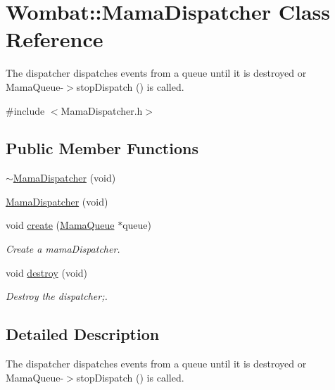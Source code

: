 \hypertarget{classWombat_1_1MamaDispatcher}{
\section{Wombat::MamaDispatcher Class Reference}
\label{classWombat_1_1MamaDispatcher}
}


The dispatcher dispatches events from a queue until it is destroyed or MamaQueue-\/$>$stopDispatch () is called.  


{\ttfamily \#include $<$MamaDispatcher.h$>$}\subsection*{Public Member Functions}
\begin{DoxyCompactItemize}
\item 
\hyperlink{classWombat_1_1MamaDispatcher_a3a997e7754864628bbd644d6536cffba}{$\sim$MamaDispatcher} (void)
\item 
\hyperlink{classWombat_1_1MamaDispatcher_a5942bec14afa1fd102d3e87fa2f04202}{MamaDispatcher} (void)
\item 
void \hyperlink{classWombat_1_1MamaDispatcher_a0e06030055142e7c6f576a560a17f3b9}{create} (\hyperlink{classWombat_1_1MamaQueue}{MamaQueue} $\ast$queue)
\begin{DoxyCompactList}\small\item\em Create a mamaDispatcher. \item\end{DoxyCompactList}\item 
void \hyperlink{classWombat_1_1MamaDispatcher_aef804bf330b0fec1594bdddf41c0d82c}{destroy} (void)
\begin{DoxyCompactList}\small\item\em Destroy the dispatcher;. \item\end{DoxyCompactList}\end{DoxyCompactItemize}


\subsection{Detailed Description}
The dispatcher dispatches events from a queue until it is destroyed or MamaQueue-\/$>$stopDispatch () is called. 

